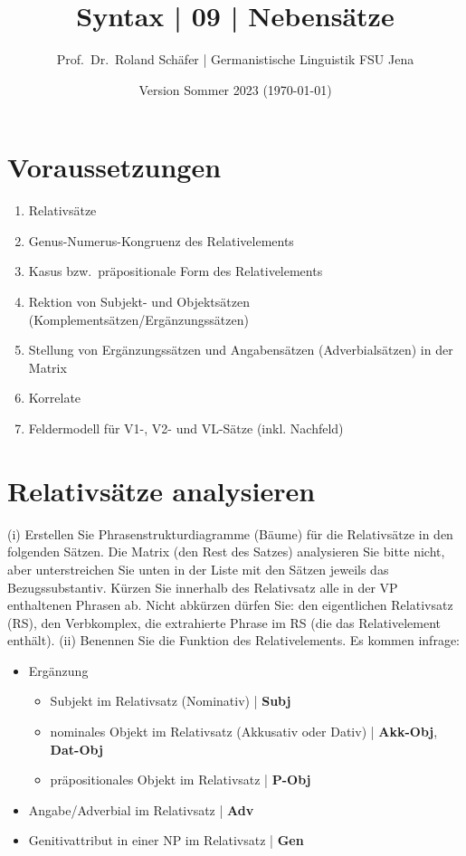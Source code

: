 \documentclass[12pt,a4paper,twoside]{article}
\author{Prof.\ Dr.\ Roland Schäfer | Germanistische Linguistik FSU Jena}
\title{Syntax | 09 | Nebensätze}
\date{Version Sommer 2023 (\today)}
\newcommand{\Lf}{
  \setlength{\itemsep}{1pt}
  \setlength{\parskip}{0pt}
  \setlength{\parsep}{0pt}
}
\begin{document}
\maketitle

\section*{Voraussetzungen}

\begin{enumerate}\Lf
  \item Relativsätze
  \item Genus-Numerus-Kongruenz des Relativelements
  \item Kasus bzw.\ präpositionale Form des Relativelements
  \item Rektion von Subjekt- und Objektsätzen (Komplementsätzen\slash Ergänzungssätzen) 
  \item Stellung von Ergänzungssätzen und Angabensätzen (Adverbialsätzen) in der Matrix
  \item Korrelate
  \item Feldermodell für V1-, V2- und VL-Sätze (inkl. Nachfeld)
\end{enumerate}

\section{Relativsätze analysieren}\label{sec:relativ}

(i) Erstellen Sie Phrasenstrukturdiagramme (Bäume) für die Relativsätze in den folgenden Sätzen.
Die Matrix (den Rest des Satzes) analysieren Sie bitte nicht, aber unterstreichen Sie unten in der Liste mit den Sätzen jeweils das Bezugssubstantiv.
Kürzen Sie innerhalb des Relativsatz alle in der VP enthaltenen Phrasen ab.
Nicht abkürzen dürfen Sie: den eigentlichen Relativsatz (RS), den Verbkomplex, die extrahierte Phrase im RS (die das Relativelement enthält).
(ii) Benennen Sie die Funktion des Relativelements.
Es kommen infrage:

\begin{itemize}\Lf
  \item Ergänzung
    \begin{itemize}\Lf
      \item Subjekt im Relativsatz (Nominativ) | \textbf{Subj}
      \item nominales Objekt im Relativsatz (Akkusativ oder Dativ) | \textbf{Akk-Obj}, \textbf{Dat-Obj}
      \item präpositionales Objekt im Relativsatz | \textbf{P-Obj}
    \end{itemize}
  \item Angabe\slash Adverbial im Relativsatz | \textbf{Adv}
  \item Genitivattribut in einer NP im Relativsatz | \textbf{Gen}
\end{itemize}
\end{document}
